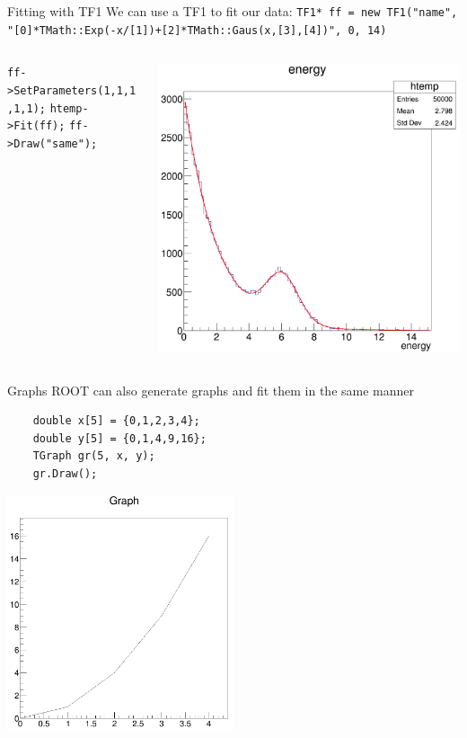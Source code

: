 \documentclass[xcolor=svgnames]{beamer}
\begin{document}
\begin{frame}{Fitting with TF1}
  We can use a TF1 to fit our data: 
  \lstinline{TF1* ff = new TF1("name",}
  \lstinline{ "[0]*TMath::Exp(-x/[1])+[2]*TMath::Gaus(x,[3],[4])", 0, 14)}
  \begin{columns}
    \begin{column}{0.4\textwidth}
      \lstinline{ff->SetParameters(1,1,1,1,1);}
      \lstinline{htemp->Fit(ff);}
      \lstinline{ff->Draw("same");}
    \end{column}
    \begin{column}{0.6\textwidth}
      \includegraphics[width=\textwidth]{images/fit.png}
    \end{column}
  \end{columns}      
\end{frame}

\begin{frame}[fragile]{Graphs}
  ROOT can also generate graphs and fit them in the same manner
  \begin{lstlisting}
    double x[5] = {0,1,2,3,4};
    double y[5] = {0,1,4,9,16};
    TGraph gr(5, x, y);
    gr.Draw();
  \end{lstlisting}
  \begin{center}
    \includegraphics[width=0.5\textwidth]{images/graph.png}
  \end{center}
\end{frame}
\end{document}
